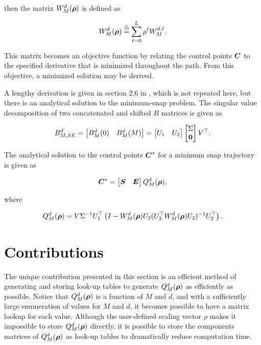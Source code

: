 then the matrix $W_M^{d}(\boldsymbol{\rho})$ is defined as

\begin{align}
    W_M^{d}(\boldsymbol{\rho}) \stackrel{\triangle}{=} \sum_{\ell=0}^L \rho^\ell W_M^{d,\ell}.
\end{align}

This matrix becomes an objective function by relating the control points $\boldsymbol{C}$ to the specified derivative that is minimized throughout the path. 
From this objective, a minimized solution may be derived.

A lengthy derivation is given in section 2.6 in \cite{beard2025BSplines}, which is not repeated here, but there is an analytical solution to the minimum-snap problem.
The singular value decomposition of two concatenated and shifted $B$ matrices is given as

\begin{align}
    B^d_{M,SE} = 
    \begin{bmatrix} 
        B_M^d(0) & B_M^d(M) 
    \end{bmatrix} =
    \begin{bmatrix}
        U_1 & U_2
    \end{bmatrix}
    \begin{bmatrix}
        \Sigma \\ 
        \boldsymbol{0} 
    \end{bmatrix} 
    V^\top.
\end{align}

The analytical solution to the control points $\boldsymbol{C}^*$ for a minimum snap trajectory is given as

\begin{align}
    \boldsymbol{C}^\ast = 
    \begin{bmatrix} 
        \boldsymbol{S} & \boldsymbol{E} 
    \end{bmatrix}
    Q_M^{d}(\boldsymbol{\rho}),
\end{align}

where

\begin{align}
     Q_M^{d}(\boldsymbol{\rho}) = V \Sigma^{-1} U_1^\top \left( I - W_M^{d}(\boldsymbol{\rho}) U_2 (U_2^\top W_M^{d}(\boldsymbol{\rho}) U_2 )^{-1} U_2^\top \right).
\end{align}

\section{Contributions}

The unique contribution presented in this section is an efficient method of generating and storing look-up tables to generate $Q_M^{d}(\boldsymbol{\rho})$ as efficiently as possible. 
Notice that $Q_M^{d}(\boldsymbol{\rho})$ is a function of $M$ and $d$, and with a sufficiently large enumeration of values for $M$ and $d$, it becomes possible to have a matrix lookup for each value. 
Although the user-defined scaling vector $\rho$ makes it impossible to store $Q_M^d(\boldsymbol{\rho})$ directly, it is possible to store the components matrices of $Q_M^d(\boldsymbol{\rho})$ as look-up tables to dramatically reduce computation time. 

